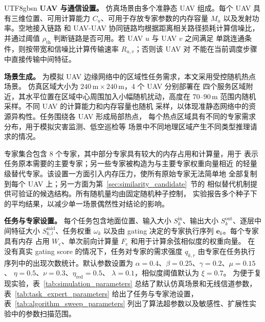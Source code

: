 \documentclass[conference]{IEEEtran}
\begin{document}
\begin{CJK*}{UTF8}{gbsn}
\textbf{UAV 与通信设置。}
仿真场景由多个准静态 UAV 组成。每个 UAV 具有三维位置、可用计算能力
$C_u$、可用于存放专家参数的内存容量 $M_u$ 以及发射功率。空地接入链路
和 UAV-UAV 协同链路均根据距离相关路径损耗计算信噪比，并通过阈值
$\rho_{\mathrm{th}}$ 判断链路是否可用。若 UAV $u$ 与 UAV $v$ 之间满足
单跳连通条件，则按带宽和信噪比计算传输速率 $R_{u,v}$；否则该 UAV 对
不能在当前调度步骤中直接传输中间特征。

\textbf{场景生成。}
为模拟 UAV 边缘网络中的区域性任务需求，本文采用受控随机热点场景。
仿真区域大小为 $240\,\mathrm{m}\times240\,\mathrm{m}$，4 个 UAV 分别部署在
四个服务区域附近，其水平位置在区域中心周围加入小幅随机扰动，高度在
$70$--$90$\,m 范围内随机采样。不同 UAV 的计算能力和内存容量也随机
采样，以体现准静态网络中的资源异构性。任务围绕各 UAV 形成局部热点，
每个热点区域具有不同的专家需求分布，用于模拟灾害监测、低空巡检等
场景中不同地理区域产生不同类型推理请求的情况。

专家集合包含 8 个专家，其中部分专家具有较大的内存占用和计算量，用于
表示任务原本需要的主要专家；另一些专家被构造为与主要专家权重向量相近
的轻量级替代专家。该设置一方面引入内存压力，使所有原始专家无法简单地
全部复制到每个 UAV 上；另一方面为第~\ref{sec:similarity_candidate}~节的
相似替代机制提供可验证的候选结构。所有随机量均由固定随机种子控制，
实验报告多个种子下的平均结果，以减少单一场景偶然性对结论的影响。

\textbf{任务与专家设置。}
每个任务包含地面位置、输入大小 $S_k^{\mathrm{in}}$、输出大小
$S_k^{\mathrm{out}}$、逐层中间特征大小 $S_{k,l}^{\mathrm{mid}}$、任务权重
$\omega_k$ 以及由 gating 决定的专家执行序列 $\mathbf{e}_k$。每个专家具有内存
占用 $W_e$、单次前向计算量 $F_e$ 和用于计算余弦相似度的权重向量。
在没有真实 gating score 的情况下，任务对专家的需求强度 $q_{k,r}$
由专家在任务执行序列中的出现次数统计。默认参数设置为
$\alpha=0.4$、$\beta=0.25$、$\gamma=0.2$、$\mu=0.15$、
$\eta=0.5$、$\nu=0.3$、$\eta_{\mathrm{red}}=0.5$、
$\lambda=0.1$，相似度阈值默认为 $\xi=0.7$。
为便于复现实验，表~\ref{tab:simulation_parameters} 总结了默认仿真场景和无线信道参数，
表~\ref{tab:task_expert_parameters} 给出了任务与专家池设置，表~\ref{tab:algorithm_sweep_parameters}
列出了算法超参数以及敏感性、扩展性实验中的参数扫描范围。


\end{CJK*}
\end{document}
